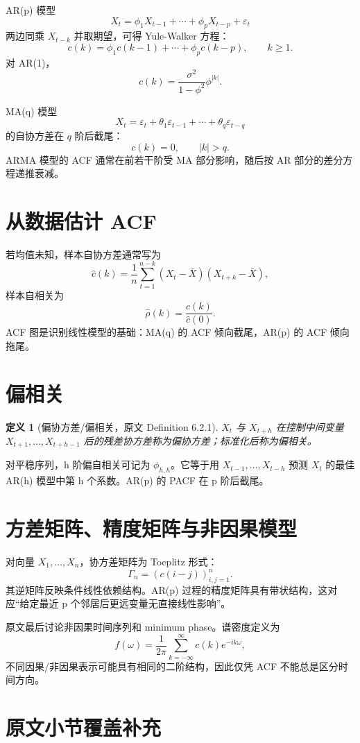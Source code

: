 \documentclass[11pt,a4paper]{ctexart}
\newtheorem{definition}{定义}[section]
\begin{document}
AR(p) 模型
\[
  X_t=\phi_1X_{t-1}+\cdots+\phi_pX_{t-p}+\varepsilon_t
\]
两边同乘 \(X_{t-k}\) 并取期望，可得 Yule-Walker 方程：
\[
  c(k)=\phi_1c(k-1)+\cdots+\phi_pc(k-p),\qquad k\ge1.
\]
对 AR(1)，
\[
  c(k)=\frac{\sigma^2}{1-\phi^2}\phi^{|k|}.
\]

MA(q) 模型
\[
  X_t=\varepsilon_t+\theta_1\varepsilon_{t-1}+\cdots+\theta_q\varepsilon_{t-q}
\]
的自协方差在 \(q\) 阶后截尾：
\[
  c(k)=0,\qquad |k|>q.
\]
ARMA 模型的 ACF 通常在前若干阶受 MA 部分影响，随后按 AR 部分的差分方程递推衰减。

\section{从数据估计 ACF}

若均值未知，样本自协方差通常写为
\[
  \hat c(k)=\frac1n\sum_{t=1}^{n-k}(X_t-\bar X)(X_{t+k}-\bar X),
\]
样本自相关为
\[
  \hat\rho(k)=\frac{\hat c(k)}{\hat c(0)}.
\]
ACF 图是识别线性模型的基础：MA(q) 的 ACF 倾向截尾，AR(p) 的 ACF 倾向拖尾。

\section{偏相关}

\begin{definition}[偏协方差/偏相关，原文 Definition 6.2.1]
\(X_t\) 与 \(X_{t+h}\) 在控制中间变量 \(X_{t+1},\ldots,X_{t+h-1}\) 后的残差协方差称为偏协方差；标准化后称为偏相关。
\end{definition}

对平稳序列，h 阶偏自相关可记为 \(\phi_{h,h}\)。它等于用 \(X_{t-1},\ldots,X_{t-h}\) 预测 \(X_t\) 的最佳 AR(h) 模型中第 h 个系数。AR(p) 的 PACF 在 p 阶后截尾。

\section{方差矩阵、精度矩阵与非因果模型}

对向量 \(X_1,\ldots,X_n\)，协方差矩阵为 Toeplitz 形式：
\[
  \Gamma_n=(c(i-j))_{i,j=1}^n.
\]
其逆矩阵反映条件线性依赖结构。AR(p) 过程的精度矩阵具有带状结构，这对应“给定最近 p 个邻居后更远变量无直接线性影响”。

原文最后讨论非因果时间序列和 minimum phase。谱密度定义为
\[
  f(\omega)=\frac1{2\pi}\sum_{k=-\infty}^{\infty}c(k)e^{-ik\omega},
\]
不同因果/非因果表示可能具有相同的二阶结构，因此仅凭 ACF 不能总是区分时间方向。

\section{原文小节覆盖补充}
\end{document}
